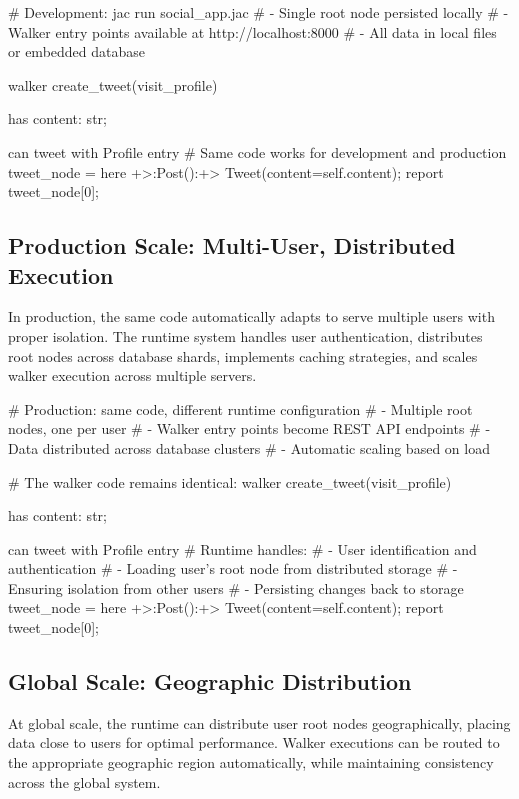\begin{jacblock}
# Development: jac run social_app.jac
# - Single root node persisted locally
# - Walker entry points available at http://localhost:8000
# - All data in local files or embedded database

walker create_tweet(visit_profile) {
    has content: str;

    can tweet with Profile entry {
        # Same code works for development and production
        tweet_node = here +>:Post():+> Tweet(content=self.content);
        report tweet_node[0];
    }
}
\end{jacblock}

\subsection{Production Scale: Multi-User, Distributed Execution}

In production, the same code automatically adapts to serve multiple users with proper isolation. The runtime system handles user authentication, distributes root nodes across database shards, implements caching strategies, and scales walker execution across multiple servers.

\begin{jacblock}
# Production: same code, different runtime configuration
# - Multiple root nodes, one per user
# - Walker entry points become REST API endpoints
# - Data distributed across database clusters
# - Automatic scaling based on load

# The walker code remains identical:
walker create_tweet(visit_profile) {
    has content: str;

    can tweet with Profile entry {
        # Runtime handles:
        # - User identification and authentication
        # - Loading user's root node from distributed storage
        # - Ensuring isolation from other users
        # - Persisting changes back to storage
        tweet_node = here +>:Post():+> Tweet(content=self.content);
        report tweet_node[0];
    }
}
\end{jacblock}

\subsection{Global Scale: Geographic Distribution}

At global scale, the runtime can distribute user root nodes geographically, placing data close to users for optimal performance. Walker executions can be routed to the appropriate geographic region automatically, while maintaining consistency across the global system.


